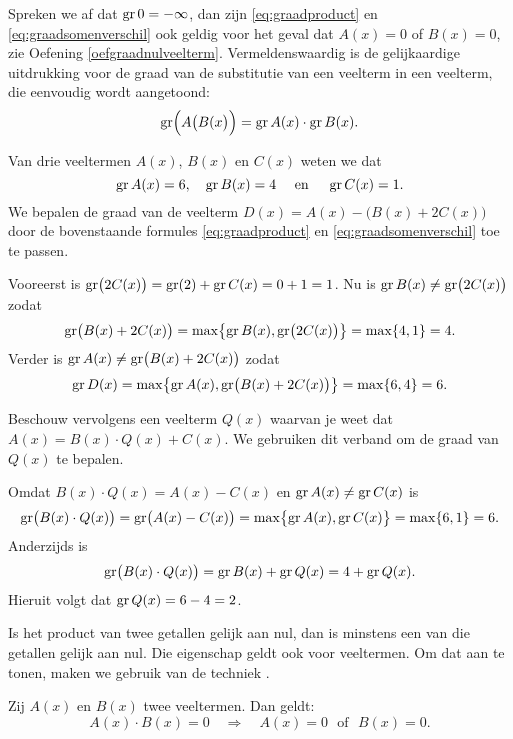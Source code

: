\documentclass{ximera}
\begin{document}
Spreken we af dat $\operatorname{gr} 0 = - \infty$, dan zijn \eqref{eq:graadproduct} en \eqref{eq:graadsomenverschil} ook geldig voor het geval dat $A(x) = 0$ of $B(x) = 0$, zie Oefening \ref{oefgraadnulveelterm}. Vermeldenswaardig is de gelijkaardige uitdrukking voor de graad van de substitutie van een veelterm in een veelterm, die eenvoudig wordt aangetoond:
\[
\operatorname{gr}\Bigl(A\bigl(B(x\bigr)\Bigr) = \operatorname{gr} A(x) \cdot \operatorname{gr} B(x).
\]


\begin{example}
Van drie veeltermen $A(x)$, $B(x)$ en $C(x)$ weten we dat
\[
\operatorname{gr} A(x) = 6, \quad \operatorname{gr} B(x) = 4 \quad \text{ en } \quad \operatorname{gr} C(x) = 1.
\]
We bepalen de graad van de veelterm $D(x) = A(x) - \bigl(B(x) + 2C(x)\bigr)$ door de bovenstaande formules \eqref{eq:graadproduct} en \eqref{eq:graadsomenverschil} toe te passen. 

Vooreerst is $\operatorname{gr}\bigl(2C(x)\bigr) = \operatorname{gr}(2) + \operatorname{gr} C(x) = 0 + 1 = 1$. Nu is $\operatorname{gr} B(x) \neq \operatorname{gr}\bigl(2C(x)\bigr)$ zodat
\[
\operatorname{gr} \bigl(B(x) + 2C(x)\bigr) = \max \bigl\{\operatorname{gr} B(x),\operatorname{gr}\bigl(2C(x)\bigr)\bigr\} = \max\{4,1\} = 4.
\]
Verder is $\operatorname{gr} A(x) \neq \operatorname{gr}\bigl(B(x) + 2C(x)\bigr)$ zodat 
\[
\operatorname{gr} D(x) = \max \bigl\{\operatorname{gr} A(x),\operatorname{gr}\bigl(B(x) + 2C(x)\bigr)\bigr\} = \max\{6,4\} = 6.
\]

Beschouw vervolgens een veelterm $Q(x)$ waarvan je weet dat $A(x) = B(x)\cdot Q(x) + C(x)$. We gebruiken dit verband om de graad van $Q(x)$ te bepalen. 

Omdat $B(x)\cdot Q(x) = A(x) - C(x)$ en $\operatorname{gr} A(x) \neq \operatorname{gr} C(x)$ is
\[
\operatorname{gr}\bigl(B(x)\cdot Q(x)\bigr) = \operatorname{gr}\bigl(A(x) - C(x)\bigr) = \max \bigl\{\operatorname{gr} A(x),\operatorname{gr} C(x)\bigr\} = \max\{6,1\} = 6.
\]
Anderzijds is 
\[
\operatorname{gr}\bigl(B(x)\cdot Q(x)\bigr) = \operatorname{gr} B(x) + \operatorname{gr} Q(x) = 4 + \operatorname{gr} Q(x).
\]
Hieruit volgt dat $\operatorname{gr} Q(x) = 6-4 = 2$. 
\end{example}

Is het product van twee getallen gelijk aan nul, dan is minstens een van die getallen gelijk aan nul. Die eigenschap geldt ook voor veeltermen. Om dat aan te tonen, maken we gebruik van de techniek . 
 
\begin{eigenschap} \label{eigenschap:geennuldelers}
Zij $A(x)$ en $B(x)$ twee veeltermen. Dan geldt: 
\[
A(x)\cdot B(x) = 0 \quad \Rightarrow \quad A(x) = 0 \,\,\text{ of } \,\, B(x) = 0.
\]
\end{eigenschap}
\end{document}
